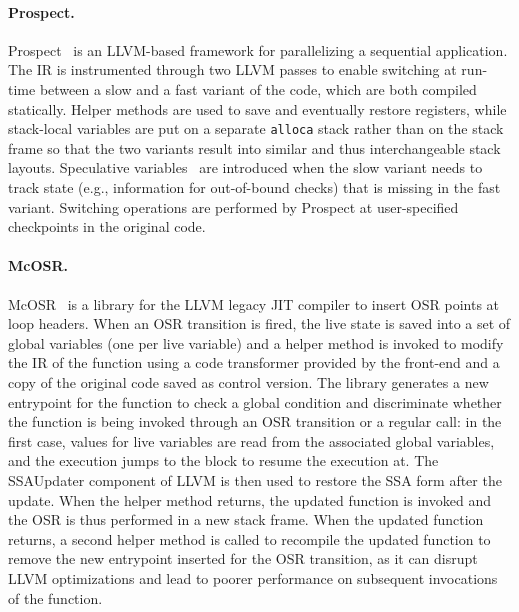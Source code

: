 
\paragraph{Prospect.} Prospect~\cite{susskraut2010prospect} is an LLVM-based framework for parallelizing a sequential application. The IR is instrumented through two LLVM passes to enable switching at run-time between a slow and a fast variant of the code, which are both compiled statically. Helper methods are used to save and eventually restore registers, while stack-local variables are put on a separate {\tt alloca} stack rather than on the stack frame so that the two variants result into similar and thus interchangeable stack layouts.
\ifdefined \fullver
Speculative variables~\cite{susskraut2009speculation} are introduced when the slow variant needs to track state (e.g., information for out-of-bound checks) that is missing in the fast variant. Switching operations are performed by Prospect at user-specified checkpoints in the original code.
\fi

\paragraph{McOSR.} McOSR~\cite{lameed2013modular} is a library for the LLVM legacy JIT compiler to insert OSR points at loop headers. When an OSR transition is fired, the live state is saved into a set of global variables (one per live variable) and a helper method is invoked to modify the IR of the function using a code transformer provided by the front-end and a copy of the original code saved as control version. The library generates a new entrypoint for the function to check a global condition and discriminate whether the function is being invoked through an OSR transition or a regular call: in the first case, values for live variables are read from the associated global variables, and the execution jumps to the block to resume the execution at.
\ifdefined \fullver
The SSAUpdater component of LLVM is then used to restore the SSA form after the update.
\fi
When the helper method returns, the updated function is invoked and the OSR is thus performed in a new stack frame. When the updated function returns, a second helper method is called to recompile the updated function to remove the new entrypoint inserted for the OSR transition, as it can disrupt LLVM optimizations and lead to poorer performance on subsequent invocations of the function.

